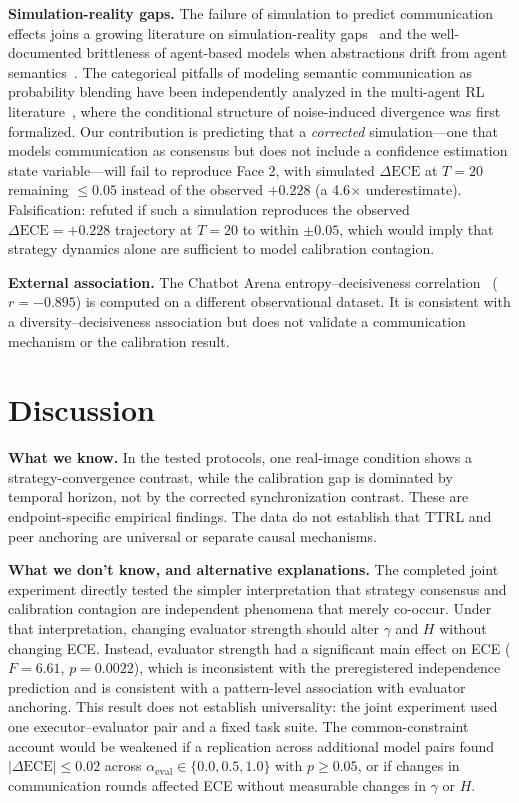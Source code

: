 \documentclass[11pt]{article}
\begin{document}
\textbf{Simulation-reality gaps.} The failure of simulation to predict communication effects joins a growing literature on simulation-reality gaps~\cite{richter2024bridging} and the well-documented brittleness of agent-based models when abstractions drift from agent semantics~\cite{foerster2018emergent}. The categorical pitfalls of modeling semantic communication as probability blending have been independently analyzed in the multi-agent RL literature~\cite{foerster2016learning,kapetanakis2014balanced}, where the conditional structure of noise-induced divergence was first formalized. Our contribution is predicting that a \textit{corrected} simulation---one that models communication as consensus but does not include a confidence estimation state variable---will fail to reproduce Face 2, with simulated $\Delta\text{ECE}$ at $T = 20$ remaining $\leq 0.05$ instead of the observed $+0.228$ (a 4.6$\times$ underestimate). Falsification: refuted if such a simulation reproduces the observed $\Delta\text{ECE} = +0.228$ trajectory at $T = 20$ to within $\pm 0.05$, which would imply that strategy dynamics alone are sufficient to model calibration contagion.

\textbf{External association.} The Chatbot Arena entropy--decisiveness correlation~\cite{zheng2023chatbot,chiang2024chatbot} ($r=-0.895$) is computed on a different observational dataset. It is consistent with a diversity--decisiveness association but does not validate a communication mechanism or the calibration result.

\section{Discussion}

\textbf{What we know.} In the tested protocols, one real-image condition shows a strategy-convergence contrast, while the calibration gap is dominated by temporal horizon, not by the corrected synchronization contrast. These are endpoint-specific empirical findings. The data do not establish that TTRL and peer anchoring are universal or separate causal mechanisms.

\textbf{What we don't know, and alternative explanations.} The completed joint experiment directly tested the simpler interpretation that strategy consensus and calibration contagion are independent phenomena that merely co-occur. Under that interpretation, changing evaluator strength should alter $\gamma$ and $H$ without changing ECE. Instead, evaluator strength had a significant main effect on ECE ($F = 6.61$, $p = 0.0022$), which is inconsistent with the preregistered independence prediction and is consistent with a pattern-level association with evaluator anchoring. This result does not establish universality: the joint experiment used one executor--evaluator pair and a fixed task suite. The common-constraint account would be weakened if a replication across additional model pairs found $|\Delta\text{ECE}| \leq 0.02$ across $\alpha_{\text{eval}} \in \{0.0, 0.5, 1.0\}$ with $p \geq 0.05$, or if changes in communication rounds affected ECE without measurable changes in $\gamma$ or $H$.
\end{document}
